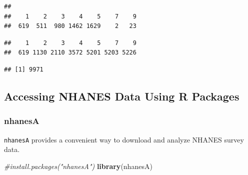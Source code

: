 \documentclass[
]{book}
\newenvironment{Shaded}{\begin{snugshade}}{\end{snugshade}}
\newcommand{\CommentTok}[1]{\textcolor[rgb]{0.56,0.35,0.01}{\textit{#1}}}
\newcommand{\KeywordTok}[1]{\textcolor[rgb]{0.13,0.29,0.53}{\textbf{#1}}}
\newcommand{\NormalTok}[1]{#1}
\newcommand{\OperatorTok}[1]{\textcolor[rgb]{0.81,0.36,0.00}{\textbf{#1}}}
\begin{document}
\begin{Shaded}
\end{Shaded}

\begin{verbatim}
## 
##    1    2    3    4    5    7    9 
##  619  511  980 1462 1629    2   23
\end{verbatim}

\begin{Shaded}
\end{Shaded}

\begin{verbatim}
##    1    2    3    4    5    7    9 
##  619 1130 2110 3572 5201 5203 5226
\end{verbatim}

\begin{Shaded}
\end{Shaded}

\begin{verbatim}
## [1] 9971
\end{verbatim}

\hypertarget{accessing-nhanes-data-using-r-packages}{%
\subsection{Accessing NHANES Data Using R Packages}\label{accessing-nhanes-data-using-r-packages}}

\hypertarget{nhanesa}{%
\subsubsection{nhanesA}\label{nhanesa}}

\texttt{nhanesA} provides a convenient way to download and analyze NHANES survey data.

\begin{Shaded}
\begin{Highlighting}[]
\CommentTok{#install.packages("nhanesA")}
\KeywordTok{library}\NormalTok{(nhanesA)}
\end{Highlighting}
\end{Shaded}
\end{document}
